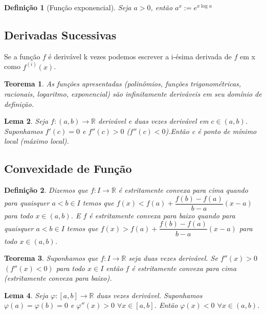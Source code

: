 \documentclass[12pt]{article}
\newtheorem{theorem}{Teorema}[section]
\newtheorem{lemma}[theorem]{Lema}
\newtheorem{definition}{Definição}
\begin{document}
\begin{definition}[Função exponencial]
    Seja $a > 0$, então $a^x := e^{x\log a}$
\end{definition}

\subsection{Derivadas Sucessivas}
Se a função $f$ é derivável k vezes podemos escrever a i-ésima derivada de $f$ em x como $f^{(i)}(x)$.

\begin{theorem}
    As funções apresentadas (polinômios, funções trigonométricas, racionais, logaritmo, exponencial) são infinitamente deriváveis em seu domínio de definição.
\end{theorem}

\begin{lemma}
    Seja $f: (a, b) \rightarrow{} \mathbb{R}$ derivável e duas vezes derivável em $c \in (a, b)$. Suponhamos $f'(c) = 0$ e $f''(c) > 0$ ($f''(c) < 0$).Então c é ponto de mínimo local (máximo local).
\end{lemma}

\subsection{Convexidade de Função}
\begin{definition}
    Dizemos que $f: I \rightarrow{} \mathbb{R}$ é estritamente convexa para cima quando para quaisquer $a < b \in I$ temos que $f(x) < f(a) + \dfrac{f(b) - f(a)}{b - a}(x - a)$ para todo $x \in (a, b)$. E $f$ é estritamente convexa para baixo quando para quaisquer $a < b \in I$ temos que $f(x) > f(a) + \dfrac{f(b) - f(a)}{b - a}(x - a)$ para todo $x \in (a, b)$.
\end{definition}

\begin{theorem}
    Suponhamos que $f: I \rightarrow{} \mathbb{R}$ seja duas vezes derivável. Se $f''(x) > 0$ $(f''(x) < 0)$ para todo $x \in I$ então $f$ é estritamente convexa para cima (estritamente convexa para baixo).
\end{theorem}

\begin{lemma}
    Seja $\varphi: [a, b] \rightarrow{} \mathbb{R}$ duas vezes derivável. Suponhamos $\varphi (a) = \varphi (b) = 0$ e $\varphi'' (x) > 0$ $\forall x \in [a, b]$. Então $\varphi (x) < 0$ $\forall x \in (a, b).$
\end{lemma}
\end{document}
